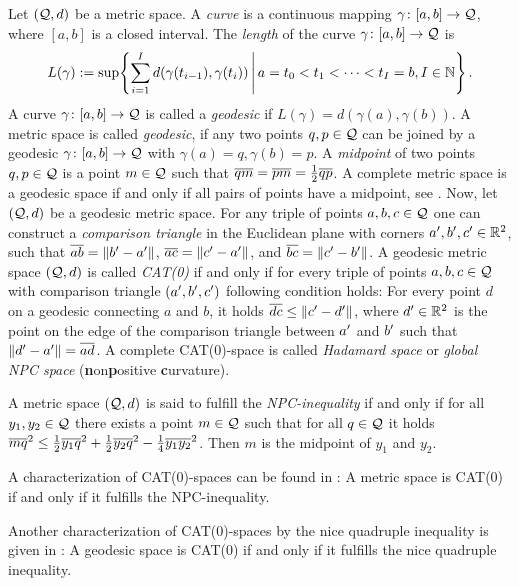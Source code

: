 Let $(\mathcal{Q}, d)$ be a metric space. A \textit{curve} is a continuous mapping $\gamma \colon [a,b] \to \mathcal{Q}$, where $[a,b]$ is a closed interval. The \textit{length} of the curve $\gamma \colon [a,b] \to \mathcal{Q}$ is
%
\begin{equation*}
	L(\gamma) := \sup\mathopen{}\left\lbrace \sum_{i=1}^I d(\gamma(t_{i-1}), \gamma(t_i)) \,\Bigg\vert\, a = t_0 < t_1 < \dots < t_I = b, I\in\mathbb{N} \right\rbrace\mathclose{}
	\, .
\end{equation*}
%
A curve $\gamma \colon [a,b] \to \mathcal{Q}$ is called a \textit{geodesic} if $L(\gamma) = d(\gamma(a),\gamma(b))$.
A metric space is called \textit{geodesic}, if any two points $q,p\in\mathcal{Q}$ can be joined by a geodesic $\gamma \colon [a,b] \to \mathcal{Q}$ with $\gamma(a) = q, \gamma(b) = p$.
A \textit{midpoint} of two points $q,p\in\mathcal{Q}$ is a point $m\in \mathcal{Q}$ such that $\overline{qm} = \overline{pm} = \frac12 \overline{qp}$.
A complete metric space is a geodesic space if and only if all pairs of points have a midpoint, see \cite[Proposition 1.2]{sturm03}.
Now, let $(\mathcal{Q}, d)$ be a geodesic metric space.
For any triple of points $a,b,c\in\mathcal{Q}$ one can construct a \textit{comparison triangle} in the Euclidean plane with corners $a^\prime, b^\prime, c^\prime \in \mathbb{R}^2$, such that $\overline{ab} = \Vert b^\prime - a^\prime \Vert$, $\overline{ac} = \Vert c^\prime - a^\prime \Vert$, and $\overline{bc} = \Vert c^\prime - b^\prime \Vert$. A geodesic metric space  $(\mathcal{Q}, d)$ is called \textit{CAT(0)} if and only if for every triple of points $a,b,c\in\mathcal{Q}$ with comparison triangle $(a^\prime, b^\prime, c^\prime)$ following condition holds: For every point $d$ on a geodesic connecting $a$ and $b$, it holds $\overline{dc} \leq \Vert c^\prime - d^\prime \Vert$, where $d^\prime \in \mathbb{R}^2$ is the point on the edge of the comparison triangle between $a^\prime$ and $b^\prime$ such that $\Vert d^\prime- a^\prime \Vert = \overline{ad}$.
A complete CAT(0)-space is called \textit{Hadamard space} or \textit{global NPC space} (\textbf{n}on\textbf{p}ositive \textbf{c}urvature).

A metric space $(\mathcal{Q}, d)$ is said to fulfill the \textit{NPC-inequality} if and only if for all $y_1, y_2 \in \mathcal{Q}$ there exists a point $m\in\mathcal{Q}$ such that for all $q \in \mathcal{Q}$ it holds
$\overline{mq}^2 \leq \frac12 \overline{y_1q}^2 + \frac12 \overline{y_2q}^2 - \frac14 \overline{y_1y_2}^2$. Then $m$ is the midpoint of $y_1$ and $y_2$.

A characterization of CAT(0)-spaces can be found in \cite[Section 2]{sturm03}:
	A metric space is CAT(0) if and only if it fulfills the NPC-inequality.

Another characterization of CAT(0)-spaces by the nice quadruple inequality is given in \cite[Corollary 3]{berg08}:
A geodesic space is CAT(0) if and only if it fulfills the nice quadruple inequality.
	
